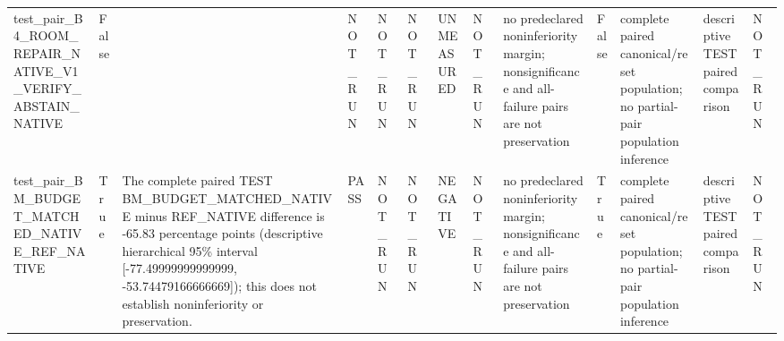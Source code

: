 \begin{tabular}{lllllllllllll}
test\_pair\_B4\_ROOM\_REPAIR\_NATIVE\_V1\_VERIFY\_ABSTAIN\_NATIVE & False &  & NOT\_RUN & NOT\_RUN & NOT\_RUN & UNMEASURED & NOT\_RUN & no predeclared noninferiority margin; nonsignificance and all-failure pairs are not preservation & False & complete paired canonical/reset population; no partial-pair population inference & descriptive TEST paired comparison & NOT\_RUN \\
test\_pair\_BM\_BUDGET\_MATCHED\_NATIVE\_REF\_NATIVE & True & The complete paired TEST BM\_BUDGET\_MATCHED\_NATIVE minus REF\_NATIVE difference is -65.83 percentage points (descriptive hierarchical 95\% interval [-77.49999999999999, -53.74479166666669]); this does not establish noninferiority or preservation. & PASS & NOT\_RUN & NOT\_RUN & NEGATIVE & NOT\_RUN & no predeclared noninferiority margin; nonsignificance and all-failure pairs are not preservation & True & complete paired canonical/reset population; no partial-pair population inference & descriptive TEST paired comparison & NOT\_RUN \\
\end{tabular}
